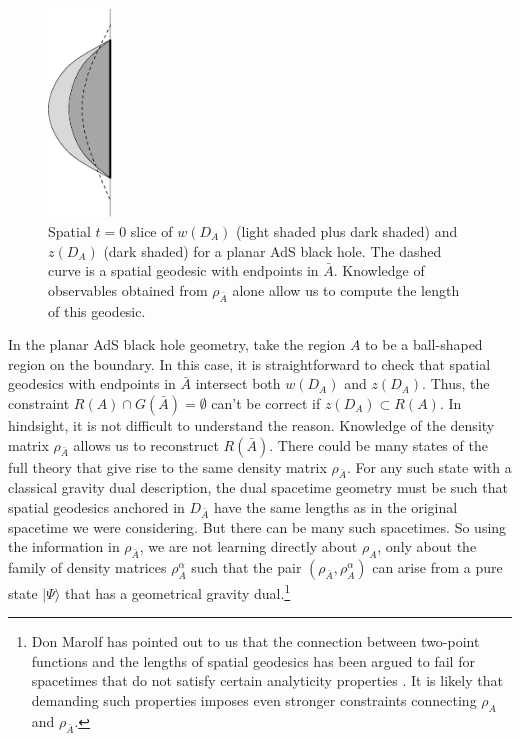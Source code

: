 \documentclass[12pt]{article}
\renewcommand{\(}{\left(}
\renewcommand{\)}{\right)}
\begin{document}
\begin{figure}
\centering
\includegraphics[width=0.15\textwidth]{GA.eps}
\caption{Spatial $t=0$ slice of $w(D_A)$ (light shaded plus dark shaded) and $z(D_A)$ (dark shaded) for a planar AdS black hole. The dashed curve is a spatial geodesic with endpoints in $\bar{A}$. Knowledge of observables obtained from $\rho_{\bar{A}}$ alone allow us to compute the length of this geodesic.}
\label{g-overlap}
\end{figure}

In the planar AdS black hole geometry, take the region $A$ to be a ball-shaped region on the boundary. In this case, it is straightforward to check that spatial geodesics with endpoints in $\bar{A}$ intersect both $w(D_A)$ and $z(D_A)$. Thus, the constraint $R(A) \cap G(\bar{A}) = \emptyset$ can't be correct if $z(D_A) \subset R(A)$. In hindsight, it is not difficult to understand the reason. Knowledge of the density matrix $\rho_{\bar{A}}$ allows us to reconstruct $R(\bar{A})$. There could be many states of the full theory that give rise to the same density matrix $\rho_{\bar{A}}$. For any such state with a classical gravity dual description, the dual spacetime geometry must be such that spatial geodesics anchored in $D_{\bar{A}}$ have the same lengths as in the original spacetime we were considering. But there can be many such spacetimes. So using the information in $\rho_{\bar{A}}$, we are not learning directly about $\rho_A$, only about the family of density matrices $\rho_A^\alpha$ such that the pair $(\rho_{\bar{A}}, \rho_A^\alpha)$ can arise from a pure state $|\Psi \rangle$ that has a geometrical gravity dual.\footnote{Don Marolf has pointed out to us that the connection between two-point functions and the lengths of spatial geodesics has been argued to fail for spacetimes that do not satisfy certain analyticity properties \cite{marolf}. It is likely that demanding such properties imposes even stronger constraints connecting $\rho_A$ and $\rho_{\bar{A}}$.}
\end{document}
